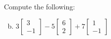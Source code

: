 \documentclass[../main.tex]{subfiles}
\begin{document}
Compute the following:

\begin{enumerate}[a)]
	\setcounter{enumi}{1}
	\item
		$
			3
			\left[\begin{array}{r}
				3 \\
				-1
			\end{array}\right]
			-
			5
			\left[\begin{array}{r}
				6 \\
				2
			\end{array}\right]
			+
			7
			\left[\begin{array}{r}
				1 \\
				-1
			\end{array}\right]
		$
\end{enumerate}

\end{document}
